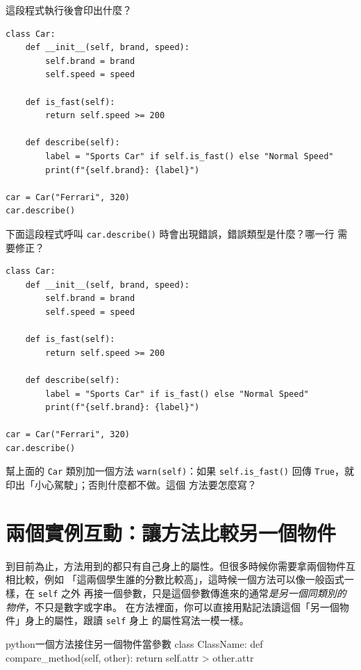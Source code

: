 \begin{drills}[label=drills:method-calls-method]
\item 這段程式執行後會印出什麼？
\begin{verbatim}
class Car:
    def __init__(self, brand, speed):
        self.brand = brand
        self.speed = speed

    def is_fast(self):
        return self.speed >= 200

    def describe(self):
        label = "Sports Car" if self.is_fast() else "Normal Speed"
        print(f"{self.brand}: {label}")

car = Car("Ferrari", 320)
car.describe()
\end{verbatim}
\item 下面這段程式呼叫 \texttt{car.describe()} 時會出現錯誤，錯誤類型是什麼？哪一行
需要修正？
\begin{verbatim}
class Car:
    def __init__(self, brand, speed):
        self.brand = brand
        self.speed = speed

    def is_fast(self):
        return self.speed >= 200

    def describe(self):
        label = "Sports Car" if is_fast() else "Normal Speed"
        print(f"{self.brand}: {label}")

car = Car("Ferrari", 320)
car.describe()
\end{verbatim}
\item 幫上面的 \texttt{Car} 類別加一個方法 \texttt{warn(self)}：如果
\texttt{self.is\_fast()} 回傳 \texttt{True}，就印出「小心駕駛」；否則什麼都不做。這個
方法要怎麼寫？
\end{drills}

\section{兩個實例互動：讓方法比較另一個物件}
\label{sec:comparing-instances}

到目前為止，方法用到的都只有自己身上的屬性。但很多時候你需要拿兩個物件互相比較，例如
「這兩個學生誰的分數比較高」，這時候一個方法可以像一般函式一樣，在 \texttt{self} 之外
再接一個參數，只是這個參數傳進來的通常\textit{是另一個同類別的物件}，不只是數字或字串。
在方法裡面，你可以直接用點記法讀這個「另一個物件」身上的屬性，跟讀 \texttt{self} 身上
的屬性寫法一模一樣。

\begin{code}{python}{一個方法接住另一個物件當參數}
class ClassName:
    def compare_method(self, other):
        return self.attr > other.attr
\end{code}

